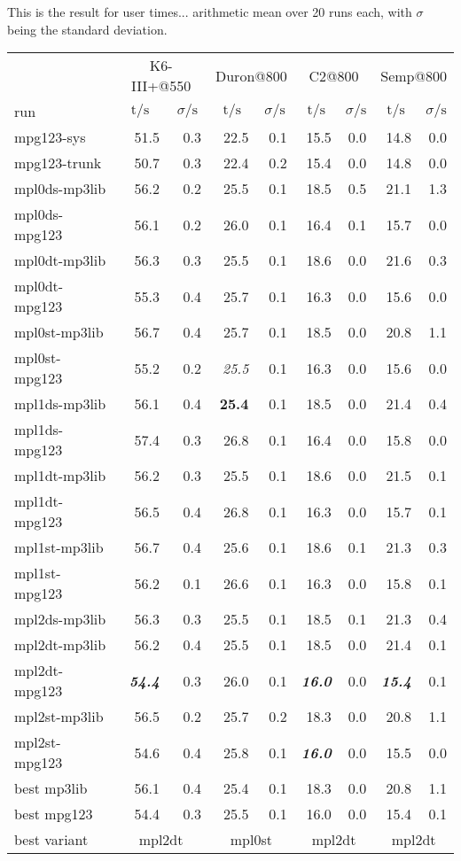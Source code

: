 \documentclass[a4paper,12pt]{scrartcl}
\newcommand{\tsigma}[0]{\multicolumn{1}{c}{$\text{t}/\text{s}$} & \multicolumn{1}{c}{$\sigma/\text{s}$}}
\newcommand{\ccenter}[1]{\multicolumn{2}{c}{#1}}
\begin{document}
This is the result for user times... arithmetic mean over 20 runs each, with $\sigma$ being the standard deviation.
\begin{center}
\begin{tabular}{lrrrrrrrr}
    & \multicolumn{2}{c}{K6-III+@550} & \multicolumn{2}{c}{Duron@800} & \multicolumn{2}{c}{C2@800} & \multicolumn{2}{c}{Semp@800} \\
run & \tsigma & \tsigma & \tsigma & \tsigma \\
\midrule
\midrule
mpg123-sys    & 51.5&0.3 & 22.5&0.1 & 15.5&0.0 & 14.8&0.0 \\
mpg123-trunk  & 50.7&0.3 & 22.4&0.2 & 15.4&0.0 & 14.8&0.0 \\
\midrule
mpl0ds-mp3lib & 56.2&0.2 & 25.5&0.1 & 18.5&0.5 & 21.1&1.3 \\
mpl0ds-mpg123 & 56.1&0.2 & 26.0&0.1 & 16.4&0.1 & 15.7&0.0 \\
mpl0dt-mp3lib & 56.3&0.3 & 25.5&0.1 & 18.6&0.0 & 21.6&0.3 \\
mpl0dt-mpg123 & 55.3&0.4 & 25.7&0.1 & 16.3&0.0 & 15.6&0.0 \\
mpl0st-mp3lib & 56.7&0.4 & 25.7&0.1 & 18.5&0.0 & 20.8&1.1 \\
mpl0st-mpg123 & 55.2&0.2 & \em{25.5}&0.1 & 16.3&0.0 & 15.6&0.0 \\
\midrule
mpl1ds-mp3lib & 56.1&0.4 & \textbf{25.4}&0.1 & 18.5&0.0 & 21.4&0.4 \\
mpl1ds-mpg123 & 57.4&0.3 & 26.8&0.1 & 16.4&0.0 & 15.8&0.0 \\
mpl1dt-mp3lib & 56.2&0.3 & 25.5&0.1 & 18.6&0.0 & 21.5&0.1 \\
mpl1dt-mpg123 & 56.5&0.4 & 26.8&0.1 & 16.3&0.0 & 15.7&0.1 \\
mpl1st-mp3lib & 56.7&0.4 & 25.6&0.1 & 18.6&0.1 & 21.3&0.3 \\
mpl1st-mpg123 & 56.2&0.1 & 26.6&0.1 & 16.3&0.0 & 15.8&0.1 \\
\midrule
mpl2ds-mp3lib & 56.3&0.3 & 25.5&0.1 & 18.5&0.1 & 21.3&0.4 \\
mpl2dt-mp3lib & 56.2&0.4 & 25.5&0.1 & 18.5&0.0 & 21.4&0.1 \\
mpl2dt-mpg123 & \textbf{\em{54.4}}&0.3 & 26.0&0.1 & \textbf{\em{16.0}}&0.0 & \textbf{\em{15.4}}&0.1 \\
mpl2st-mp3lib & 56.5&0.2 & 25.7&0.2 & 18.3&0.0 & 20.8&1.1 \\
mpl2st-mpg123 & 54.6&0.4 & 25.8&0.1 & \textbf{\em{16.0}}&0.0 & 15.5&0.0 \\
\midrule
best mp3lib & 56.1&0.4   & 25.4&0.1 & 18.3&0.0 & 20.8&1.1 \\
best mpg123 & 54.4&0.3   & 25.5&0.1 & 16.0&0.0 & 15.4&0.1 \\
best variant & \ccenter{mpl2dt} & \ccenter{mpl0st} & \ccenter{mpl2dt} & \ccenter{mpl2dt}
\end{tabular}
\end{center}
\end{document}
